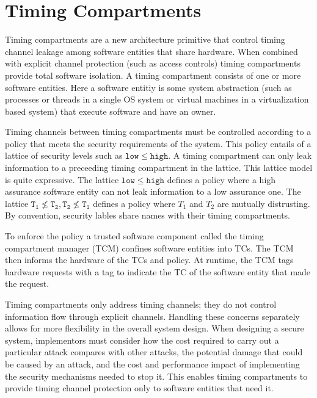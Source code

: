 \section{Timing Compartments}
    Timing compartments are a new architecture primitive that control timing 
    channel leakage among software entities that share hardware. When combined 
    with explicit channel protection (such as access controls) timing 
    compartments provide total software isolation.
    A timing compartment consists of one or more software entities. Here a 
    software entitiy is some system abstraction (such as processes or threads 
    in a single OS system or virtual machines in a virtualization based system) 
    that execute software and have an owner.
    
    Timing channels between timing compartments must be controlled according to 
    a policy that meets the security requirements of the system. This policy 
    entails of a lattice of security levels such as $\mathtt{low} \leq
    \mathtt{high}$. A timing compartment can only leak information to a 
    preceeding timing compartment in the lattice. This lattice model is quite 
    expressive. The lattice $\mathtt{low} \leq \mathtt{high}$ defines a policy 
    where a high assurance software entity can not leak information to a low 
    assurance one. The lattice $\mathtt{T_1} \nleq \mathtt{T_2}, \mathtt{T_2} 
    \nleq \mathtt{T_1}$ defines a policy where $T_1$ and $T_2$ are mutually 
    distrusting. By convention, security lables share names with their timing 
    compartments. 
 
    To enforce the policy a trusted software component called the timing 
    compartment manager (TCM) confines software entities into TCs. The TCM then 
    informs the hardware of the TCs and policy. At runtime, the TCM tags 
    hardware requests with a tag to indicate the TC of the software entity that 
    made the request. 

    Timing compartments only address timing channels; they do not control 
    information flow through explicit channels. Handling these concerns 
    separately allows for more flexibility in the overall system design.  When 
    designing a secure system, implementors must consider how the cost required 
    to carry out a particular attack compares with other attacks, the potential 
    damage that could be caused by an attack, and the cost and performance 
    impact of implementing the security mechanisms needed to stop it. This 
    enables timing compartments to provide timing channel protection only to 
    software entities that need it.

